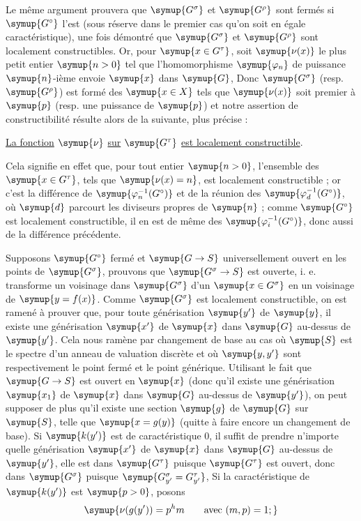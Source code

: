 Le même argument prouvera que $\symup{G^\sigma}$ et $\symup{G^\rho}$ sont fermés si $\symup{G^\circ}$
l'est (sous réserve dans le premier cas qu'on soit en égale caractéristique),
une fois démontré que $\symup{G^\sigma}$ et $\symup{G^\rho}$ sont localement constructibles.
Or, pour $\symup{x\in G^\tau}$, soit $\symup{\nu(x)}$ le plus petit entier $\symup{n>0}$ tel que
l'homomorphisme $\symup{\varphi_n}$ de puissance $\symup{n}$-ième envoie $\symup{x}$ dans $\symup{G}$,
Donc $\symup{G^\sigma}$ (resp. $\symup{G^\rho}$) est formé des $\symup{x\in X}$ tels que $\symup{\nu(x)}$ soit premier à
$\symup{p}$ (resp. une puissance de $\symup{p}$) et notre assertion de constructibilité
résulte alors de la suivante, plus précise :

 \uline{La fonction} $\symup{\nu}$ \uline{sur} $\symup{G^\tau}$ \uline{est localement constructible}.

Cela signifie en effet que, pour tout entier $\symup{n>0}$, l'ensemble des
$\symup{x\in G^\tau}$, tels que $\symup{\nu(x)=n}$, est localement constructible ; or c'est la
différence de $\symup{\varphi_n^{-1}(G^\circ)}$ et de la réunion des
$\symup{\varphi_d^{-1}(G^\circ)}$, où $\symup{d}$ parcourt les diviseurs propres de $\symup{n}$ ; comme
$\symup{G^\circ}$ est localement constructible, il en est de même des
$\symup{\varphi_i^{-1}(G^\circ)}$, donc aussi de la différence précédente.

Supposons $\symup{G^\circ}$ fermé et $\symup{G\to  S}$ universellement ouvert en les
points de $\symup{G^\sigma}$, prouvons que $\symup{G^\sigma\to  S}$ est ouverte,
i. e. transforme un voisinage dans $\symup{G^\sigma}$ d'un $\symup{x\in G^\sigma}$ en un
voisinage de $\symup{y=f(x)}$. Comme $\symup{G^\sigma}$ est localement constructible, on est
ramené à prouver que, pour toute générisation $\symup{y'}$ de $\symup{y}$, il existe une
générisation $\symup{x'}$ de $\symup{x}$ dans $\symup{G}$ au-dessus de $\symup{y'}$. Cela nous ramène
par changement de base au cas où $\symup{S}$ est le spectre d'un anneau de valuation
discrète et où $\symup{y,y'}$ sont respectivement le point fermé et le point générique.
Utilisant le fait que $\symup{G\to  S}$ est ouvert en $\symup{x}$ (donc qu'il existe
une générisation $\symup{x_1}$ de $\symup{x}$ dans $\symup{G}$ au-dessus de $\symup{y'}$), on peut supposer de
plus qu'il existe une section $\symup{g}$ de $\symup{G}$ sur $\symup{S}$, telle que $\symup{x=g(y)}$ (quitte à
faire encore un changement de base). Si $\symup{k(y')}$ est de caractéristique 0, il
suffit de prendre n'importe quelle générisation $\symup{x'}$ de $\symup{x}$ dans $\symup{G}$ au-dessus
de $\symup{y'}$, elle est dans $\symup{G^\tau}$ puisque $\symup{G^\tau}$ est ouvert, donc dans
$\symup{G^\sigma}$ puisque $\symup{G_{y'}^\sigma=G_{y'}^\tau}$, Si la caractéristique de
$\symup{k(y')}$ est $\symup{p>0}$, posons
\[
\symup{\nu(g(y'))=p^hm\qquad\text{avec }(m,p)=1 ;}
\]

